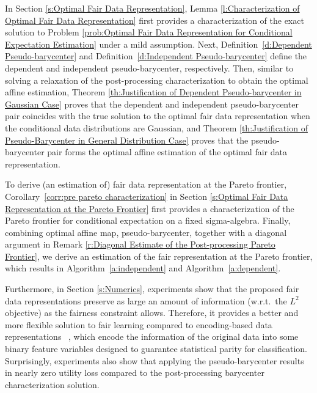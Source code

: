 \documentclass[twoside,11pt]{article}
\begin{document}
\begin{enumerate}
In Section \ref{s:Optimal Fair Data Representation}, Lemma \ref{l:Characterization of Optimal Fair Data Representation} first provides a characterization of the exact solution to Problem \ref{prob:Optimal Fair Data Representation for Conditional Expectation Estimation} under a mild assumption. Next, Definition~\ref{d:Dependent Pseudo-barycenter} and Definition~\ref{d:Independent Pseudo-barycenter} define the dependent and independent pseudo-barycenter, respectively. Then, similar to solving a relaxation of the post-processing characterization to obtain the optimal affine estimation, Theorem \ref{th:Justification of Dependent Pseudo-barycenter in Gaussian Case} proves that the dependent and independent pseudo-barycenter pair coincides with the true solution to the optimal fair data representation when the conditional data distributions are Gaussian, and Theorem \ref{th:Justification of Pseudo-Barycenter in General Distribution Case} proves that the pseudo-barycenter pair forms the optimal affine estimation of the optimal fair data representation. 

To derive (an estimation of) fair data representation at the Pareto frontier, Corollary~\ref{corr:pre pareto characterization} in Section \ref{s:Optimal Fair Data Representation at the Pareto Frontier} first provides a characterization of the Pareto frontier for conditional expectation on a fixed sigma-algebra. Finally, combining optimal affine map, pseudo-barycenter, together with a diagonal argument in Remark \ref{r:Diagonal Estimate of the Post-processing Pareto Frontier}, we derive an estimation of the fair representation at the Pareto frontier, which results in Algorithm~\ref{a:independent} and Algorithm~\ref{a:dependent}.

Furthermore, in Section \ref{s:Numerics}, experiments show that the proposed fair data representations preserve as large an amount of information (w.r.t.\ the $L^2$ objective) as the fairness constraint allows. Therefore, it provides a better and more flexible solution to fair learning compared to encoding-based data representations ~\cite{calmon2017optimized, zemel2013learning}, which encode the information of the original data into some binary feature variables designed to guarantee statistical parity for classification. Surprisingly, experiments also show that applying the pseudo-barycenter results in nearly zero utility loss compared to the post-processing barycenter characterization solution.


\end{enumerate}
\end{document}
